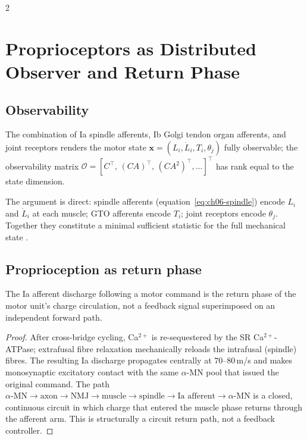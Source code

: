 \begin{multicols}{2}

\section{Proprioceptors as Distributed Observer and Return Phase}
\label{sec:ch06-proprioceptors}

\subsection{Observability}

\begin{proposition}
\label{prop:ch06-observability}
The combination of Ia spindle afferents, Ib Golgi tendon organ afferents,
and joint receptors renders the motor state
$\mathbf{x} = (L_i, \dot{L}_i, T_i, \theta_j)$ fully observable; the
observability matrix $\mathcal{O} = [C^\top,\,(CA)^\top,\,(CA^2)^\top,
\ldots]^\top$ has rank equal to the state dimension.
\end{proposition}

The argument is direct: spindle afferents (equation~\eqref{eq:ch06-spindle})
encode $L_i$ and $\dot{L}_i$ at each muscle; GTO afferents encode $T_i$;
joint receptors encode $\theta_j$.  Together they constitute a minimal
sufficient statistic for the full mechanical state
\citep{matthews1972,prochazka1989,gandevia2001}.

\subsection{Proprioception as return phase}

\begin{theorem}
\label{thm:ch06-returnphase}
The Ia afferent discharge following a motor command is the return phase of the
motor unit's charge circulation, not a feedback signal superimposed on an
independent forward path.
\end{theorem}

\begin{proof}
After cross-bridge cycling, Ca$^{2+}$ is re-sequestered by the SR
Ca$^{2+}$-ATPase; extrafusal fibre relaxation mechanically reloads the
intrafusal (spindle) fibres.  The resulting Ia discharge propagates centrally
at $70$--$80$\,m/s and makes monosynaptic excitatory contact with the same
$\alpha$-MN pool that issued the original command.  The path
$\alpha\text{-MN} \to \text{axon} \to \text{NMJ} \to \text{muscle} \to
\text{spindle} \to \text{Ia afferent} \to \alpha\text{-MN}$ is a closed,
continuous circuit in which charge that entered the muscle phase returns
through the afferent arm.  This is structurally a circuit return path,
not a feedback controller.
\end{proof}


\end{multicols}
